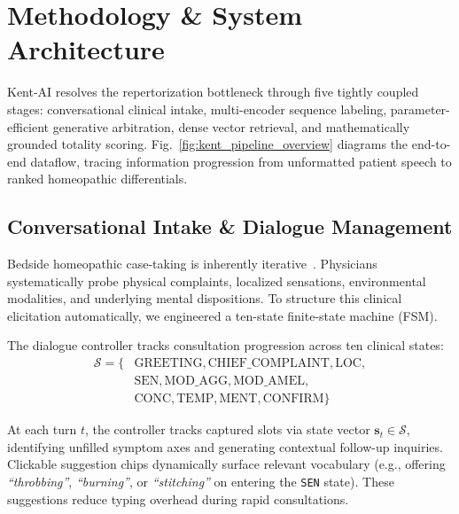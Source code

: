 \section{Methodology \& System Architecture}
\label{sec:methodology}

Kent-AI resolves the repertorization bottleneck through five tightly coupled stages: conversational clinical intake, multi-encoder sequence labeling, parameter-efficient generative arbitration, dense vector retrieval, and mathematically grounded totality scoring. Fig.~\ref{fig:kent_pipeline_overview} diagrams the end-to-end dataflow, tracing information progression from unformatted patient speech to ranked homeopathic differentials.

\subsection{Conversational Intake \& Dialogue Management}

Bedside homeopathic case-taking is inherently iterative~\cite{hahnemann1842,kent1897}. Physicians systematically probe physical complaints, localized sensations, environmental modalities, and underlying mental dispositions. To structure this clinical elicitation automatically, we engineered a ten-state finite-state machine (FSM).

The dialogue controller tracks consultation progression across ten clinical states:
\begin{equation}
    \begin{aligned}
        \mathcal{S} = \{&\text{GREETING}, \text{CHIEF\_COMPLAINT}, \text{LOC},\\
        &\text{SEN}, \text{MOD\_AGG}, \text{MOD\_AMEL},\\
        &\text{CONC}, \text{TEMP}, \text{MENT}, \text{CONFIRM}\}
    \end{aligned}
\end{equation}

At each turn $t$, the controller tracks captured slots via state vector $\mathbf{s}_t \in \mathcal{S}$, identifying unfilled symptom axes and generating contextual follow-up inquiries. Clickable suggestion chips dynamically surface relevant vocabulary (e.g., offering \textit{``throbbing''}, \textit{``burning''}, or \textit{``stitching''} on entering the \texttt{SEN} state). These suggestions reduce typing overhead during rapid consultations.

